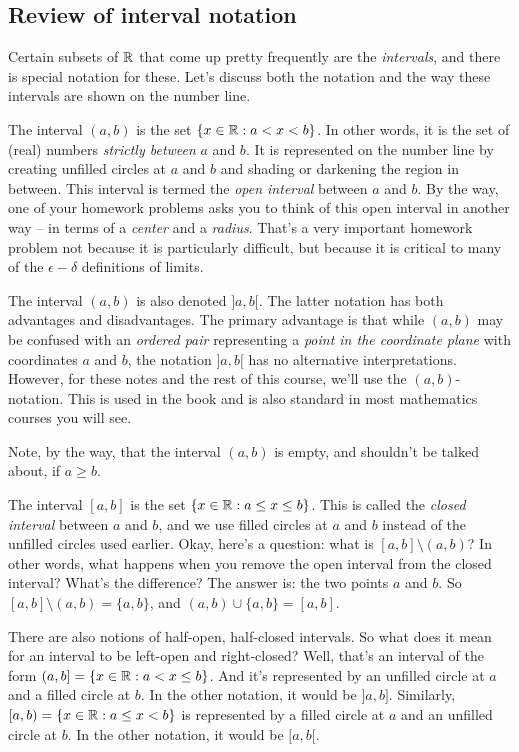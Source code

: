\documentclass{amsart}
\begin{document}
\subsection{Review of interval notation}

Certain subsets of $\mathbb{R}$ that come up pretty frequently are the {\em
intervals}, and there is special notation for these. Let's discuss
both the notation and the way these intervals are shown on the number
line.

The interval $(a,b)$ is the set $\{ x \in \mathbb{R} : a < x < b \}$. In other
words, it is the set of (real) numbers {\em strictly between} $a$ and
$b$. It is represented on the number line by creating unfilled circles
at $a$ and $b$ and shading or darkening the region in between. This
interval is termed the {\em open interval} between $a$ and $b$. By the
way, one of your homework problems asks you to think of this open
interval in another way -- in terms of a {\em center} and a {\em
  radius}. That's a very important homework problem not because it is
particularly difficult, but because it is critical to many of the
$\epsilon-\delta$ definitions of limits.

The interval $(a,b)$ is also denoted $]a,b[$. The latter notation has
both advantages and disadvantages. The primary advantage is that while
$(a,b)$ may be confused with an {\em ordered pair} representing a {\em
  point in the coordinate plane} with coordinates $a$ and $b$, the
notation $]a,b[$ has no alternative interpretations. However, for
these notes and the rest of this course, we'll use the
$(a,b)$-notation. This is used in the book and is also standard in
most mathematics courses you will see.

Note, by the way, that the interval $(a,b)$ is empty, and shouldn't be
talked about, if $a \ge b$.

The interval $[a,b]$ is the set $\{ x \in \mathbb{R} : a \le x \le b \}$. This
is called the {\em closed interval} between $a$ and $b$, and we use
filled circles at $a$ and $b$ instead of the unfilled circles used
earlier. Okay, here's a question: what is $[a,b] \setminus (a,b)$? In
other words, what happens when you remove the open interval from the
closed interval? What's the difference? The answer is: the two points
$a$ and $b$. So $[a,b] \setminus (a,b) = \{ a,b \}$, and $(a,b) \cup
\{a,b \} = [a,b]$.

There are also notions of half-open, half-closed intervals. So what
does it mean for an interval to be left-open and right-closed? Well,
that's an interval of the form $(a,b] = \{ x \in \mathbb{R}: a < x \le b
\}$. And it's represented by an unfilled circle at $a$ and a filled
circle at $b$. In the other notation, it would be $]a,b]$. Similarly,
$[a,b) = \{ x \in \mathbb{R} : a \le x < b \}$ is represented by a filled
circle at $a$ and an unfilled circle at $b$. In the other notation, it
would be $[a,b[$.
\end{document}
